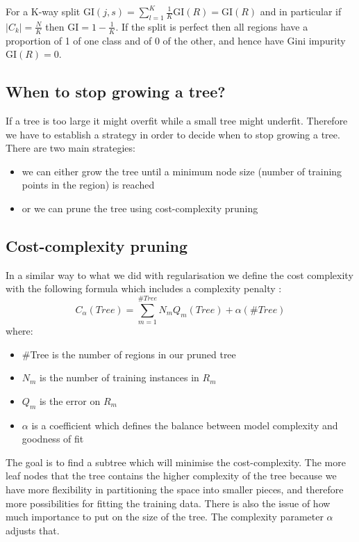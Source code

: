 \documentclass[a4paper,12pt]{article}
\begin{document}
For a K-way split  \(\textrm{GI}(j,s)= \sum_{l=1}^{K} \frac{1}{K} \textrm{GI}(R) = \textrm{GI}(R)\) and in particular if \(\left | C_k \right | = \frac{N}{K} \) then \(\textrm{GI}= 1 - \frac{1}{K} \). If the split is perfect then all regions have a proportion of 1 of one class and of 0 of
the other, and hence have Gini impurity \(\textrm{GI}(R)=0 \).


\subsection{When to stop growing a tree?}

If a tree is too large it might overfit while a small tree might underfit. Therefore we have to establish a strategy in order to decide when to stop growing a tree.
There are two main strategies:
\begin{itemize}
\item we can either grow the tree until a minimum node size (number of training points in the region) is reached
\item or we can prune the tree using cost-complexity pruning
\end{itemize}

\subsection*{Cost-complexity pruning}

In a similar way to what we did with regularisation we define the cost complexity with the following formula which includes a complexity penalty :
\[
C_\alpha (Tree)=  \sum_{m=1}^{\# Tree} N_m Q_m(Tree) + \alpha (\# Tree)
\]
where:
\begin{itemize}
\item \#Tree is the number of regions in our pruned tree
\item \(N_m\) is the number of training instances in \(R_m\)
\item \(Q_m\) is the error on \(R_m\)
\item \(\alpha \) is a coefficient which defines the balance between model complexity and goodness of fit
\end{itemize}

The goal is to find a subtree which will minimise the cost-complexity.
The more leaf nodes that the tree contains the higher complexity of the tree because we have more flexibility in partitioning the space into smaller pieces, and therefore more possibilities for fitting the training data. There is also the issue of how much importance to put on the size of the tree. The complexity parameter \(\alpha \) adjusts that.
\end{document}
